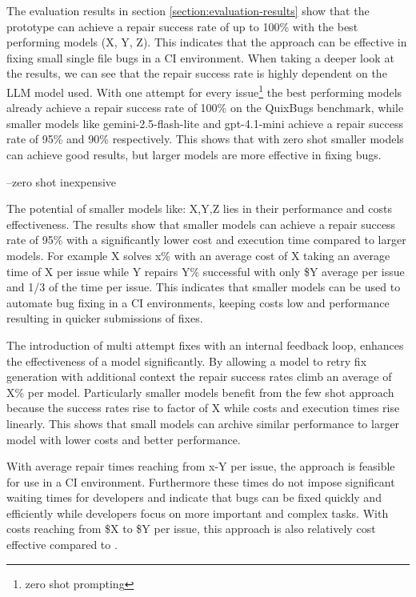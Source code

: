 The evaluation results in section \ref{section:evaluation-results} show that the prototype can achieve a repair success rate of up to 100\% with the best performing models (X, Y, Z). This indicates that the approach can be effective in fixing small single file bugs in a CI environment. When taking a deeper look at the results, we can see that the repair success rate is highly dependent on the LLM model used.
With one attempt for every issue\footnote{zero shot prompting} the best performing models already achieve a repair success rate of 100\% on the QuixBugs benchmark, while smaller models like gemini-2.5-flash-lite and gpt-4.1-mini achieve a repair success rate of 95\% and 90\% respectively. This shows that with zero shot smaller models can achieve good results, but larger models are more effective in fixing bugs.

--zero shot inexpensive

The potential of smaller models like: X,Y,Z lies in their performance and costs effectiveness. The results show that smaller models can achieve a repair success rate of 95\% with a significantly lower cost and execution time compared to larger models. For example X solves x\% with an average cost of X taking an average time of X per issue while Y repairs Y\% successful with only \$Y average per issue and 1/3 of the time per issue. This indicates that smaller models can be used to automate bug fixing in a CI environments, keeping costs low and performance resulting in quicker submissions of fixes.

The introduction of multi attempt fixes with an internal feedback loop, enhances the effectiveness of a model significantly. By allowing a model to retry fix generation with additional context the repair success rates climb an average of X\% per model. Particularly smaller models benefit from the few shot approach because the success rates rise to factor of X while costs and execution times rise linearly. This shows that small models can archive similar performance to larger model with lower costs and better performance.

With average repair times reaching from x-Y  per issue, the approach is feasible for use in a CI environment. Furthermore these times do not impose significant waiting times for developers and indicate that bugs can be fixed quickly and efficiently while developers focus on more important and complex tasks. With costs reaching from \$X to \$Y per issue, this approach is also relatively cost effective compared to .


